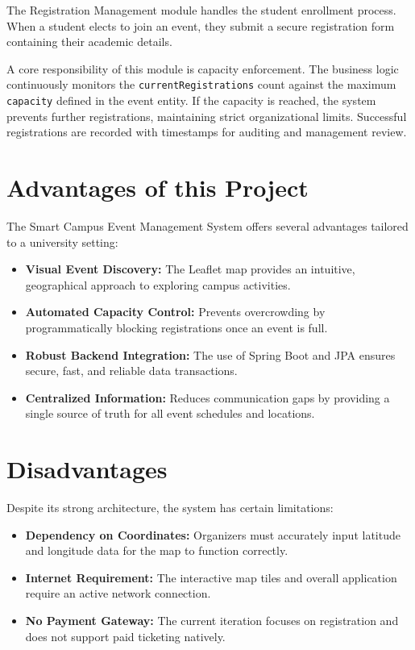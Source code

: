 \documentclass[10pt]{report}
\begin{document}
The Registration Management module handles the student enrollment process. When a student elects to join an event, they submit a secure registration form containing their academic details.

A core responsibility of this module is capacity enforcement. The business logic continuously monitors the \texttt{currentRegistrations} count against the maximum \texttt{capacity} defined in the event entity. If the capacity is reached, the system prevents further registrations, maintaining strict organizational limits. Successful registrations are recorded with timestamps for auditing and management review.


\section{Advantages of this Project}

The Smart Campus Event Management System offers several advantages tailored to a university setting:

\begin{itemize}
\item \textbf{Visual Event Discovery:} The Leaflet map provides an intuitive, geographical approach to exploring campus activities.
\item \textbf{Automated Capacity Control:} Prevents overcrowding by programmatically blocking registrations once an event is full.
\item \textbf{Robust Backend Integration:} The use of Spring Boot and JPA ensures secure, fast, and reliable data transactions.
\item \textbf{Centralized Information:} Reduces communication gaps by providing a single source of truth for all event schedules and locations.
\end{itemize}


\section{Disadvantages}

Despite its strong architecture, the system has certain limitations:

\begin{itemize}
\item \textbf{Dependency on Coordinates:} Organizers must accurately input latitude and longitude data for the map to function correctly.
\item \textbf{Internet Requirement:} The interactive map tiles and overall application require an active network connection.
\item \textbf{No Payment Gateway:} The current iteration focuses on registration and does not support paid ticketing natively.
\end{itemize}
\end{document}
